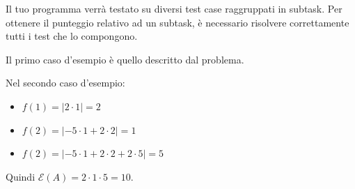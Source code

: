 \Scoring

Il tuo programma verrà testato su diversi test case raggruppati in subtask.
Per ottenere il punteggio relativo ad un subtask,
è necessario risolvere correttamente tutti i test che lo compongono.








\Examples

\begin{example}
\end{example}


\Explanation

Il primo caso d'esempio è quello descritto dal problema.

Nel secondo caso d'esempio:
\begin{itemize}
    \item $f(1) = |2\cdot 1| = 2$
    \item $f(2) = |-5\cdot 1 + 2\cdot 2| = 1$
    \item $f(2) = |-5\cdot 1 + 2\cdot 2 + 2\cdot 5| = 5$
\end{itemize}
Quindi $\mathcal{E}(A) = 2 \cdot 1 \cdot 5 = 10$.
